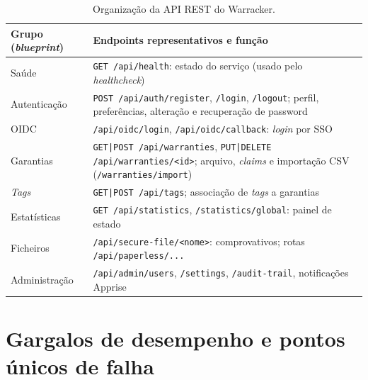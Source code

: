 \documentclass[11pt,a4paper]{article}
\newcommand{\code}[1]{\texttt{#1}}
\begin{document}
\begin{table}[h]
\centering\small
\begin{tabularx}{\linewidth}{@{}lX@{}}
\toprule
Grupo (\emph{blueprint}) & Endpoints representativos e função \\
\midrule
Saúde & \code{GET /api/health}: estado do serviço (usado pelo \emph{healthcheck}) \\
Autenticação & \code{POST /api/auth/register}, \code{/login}, \code{/logout}; perfil, preferências,
  alteração e recuperação de password \\
OIDC & \code{/api/oidc/login}, \code{/api/oidc/callback}: \emph{login} por SSO \\
Garantias & \code{GET|POST /api/warranties}, \code{PUT|DELETE /api/warranties/<id>}; arquivo,
  \emph{claims} e importação CSV (\code{/warranties/import}) \\
\emph{Tags} & \code{GET|POST /api/tags}; associação de \emph{tags} a garantias \\
Estatísticas & \code{GET /api/statistics}, \code{/statistics/global}: painel de estado \\
Ficheiros & \code{/api/secure-file/<nome>}: comprovativos; rotas \code{/api/paperless/...} \\
Administração & \code{/api/admin/users}, \code{/settings}, \code{/audit-trail}, notificações Apprise \\
\bottomrule
\end{tabularx}
\caption{Organização da API REST do Warracker.}
\label{tab:api}
\end{table}

\section{Gargalos de desempenho e pontos únicos de falha}
\end{document}
